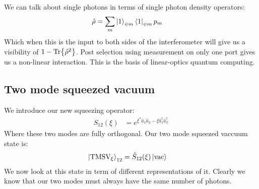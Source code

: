 We can talk about single photons in terms of single photon density operators:
\begin{align*}
	\hat{\rho} &= \sum_m \ket{1}_{\psi m}\bra{1}_{\psi m} p_m
\end{align*}
Which when this is the input to both sides of the interferometer will give us a visibility of $1-\Tr{\hat{\rho}^2}$.
Post selection using measurement on only one port gives us a non-linear interaction. This is the basis of linear-optics quantum computing.

\subsection{Two mode squeezed vacuum}
We introduce our new squeezing operator:
\begin{align*}
	\hat{S}_{12}(\xi) &= e^{\xi^* \hat{a}_1\hat{a}_2 - \xi\hat{a}_1^\dagger\hat{a}_2^\dagger}
\end{align*}
Where these two modes are fully orthogonal. Our two mode squeezed vaccuum state is:
\begin{align*}
	\ket{\text{TMSV}_\xi}_{12} &= \hat{S}_{12} (\xi)\ket{\text{vac}}
\end{align*}
We now look at this state in term of different representations of it. Clearly we know that our two modes must always have the same number of photons.

